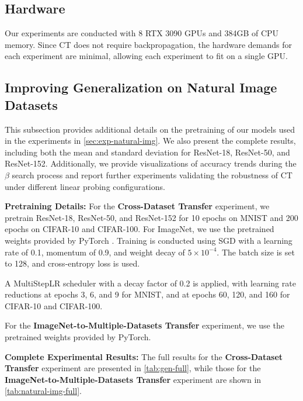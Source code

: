 \subsection{Hardware}
Our experiments are conducted with 8 RTX 3090 GPUs and 384GB of CPU memory. Since CT does not require backpropagation, the hardware demands for each experiment are minimal, allowing each experiment to fit on a single GPU.

\subsection{Improving Generalization on Natural Image
Datasets}\label{app:exp-natural-img}
This subsection provides additional details on the pretraining of our models used in the experiments in \cref{sec:exp-natural-img}. We also present the complete results, including both the mean and standard deviation for ResNet-18, ResNet-50, and ResNet-152. Additionally, we provide visualizations of accuracy trends during the $\beta$ search process and report further experiments validating the robustness of CT under different linear probing configurations.

\textbf{Pretraining Details:}
For the \textbf{Cross-Dataset Transfer} experiment, we pretrain ResNet-18, ResNet-50, and ResNet-152 for 10 epochs on MNIST and 200 epochs on CIFAR-10 and CIFAR-100. For ImageNet, we use the pretrained weights provided by PyTorch \cite{paszke2019pytorch}. Training is conducted using SGD with a learning rate of 0.1, momentum of 0.9, and weight decay of $5 \times 10^{-4}$. The batch size is set to 128, and cross-entropy loss is used. 

A MultiStepLR \cite{paszke2019pytorch} scheduler with a decay factor of 0.2 is applied, with learning rate reductions at epochs 3, 6, and 9 for MNIST, and at epochs 60, 120, and 160 for CIFAR-10 and CIFAR-100.

For the \textbf{ImageNet-to-Multiple-Datasets Transfer} experiment, we use the pretrained weights provided by PyTorch.

\textbf{Complete Experimental Results:}
The full results for the \textbf{Cross-Dataset Transfer} experiment are presented in \cref{tab:gen-full}, while those for the \textbf{ImageNet-to-Multiple-Datasets Transfer} experiment are shown in \cref{tab:natural-img-full}.

